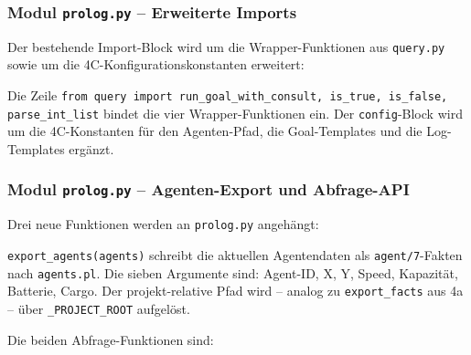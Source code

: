 
\subsubsection{Modul \texttt{prolog.py} – Erweiterte Imports}

Der bestehende Import-Block wird um die Wrapper-Funktionen aus \texttt{query.py} sowie um die 4C-Konfigurationskonstanten erweitert:





Die Zeile \texttt{from query import run\_goal\_with\_consult, is\_true, is\_false, \\ parse\_int\_list} bindet die vier Wrapper-Funktionen ein. Der \texttt{config}-Block wird um die 4C-Konstanten für den Agenten-Pfad, die Goal-Templates und die Log-Templates ergänzt.

\subsubsection{Modul \texttt{prolog.py} – Agenten-Export und Abfrage-API}

Drei neue Funktionen werden an \texttt{prolog.py} angehängt:



\texttt{export\_agents(agents)} schreibt die aktuellen Agentendaten als \texttt{agent/7}-Fakten nach \texttt{agents.pl}. Die sieben Argumente sind: Agent-ID, X, Y, Speed, Kapazität, Batterie, Cargo. Der projekt-relative Pfad wird -- analog zu \texttt{export\_facts} aus 4a -- über \texttt{\_PROJECT\_ROOT} aufgelöst.

Die beiden Abfrage-Funktionen sind:



